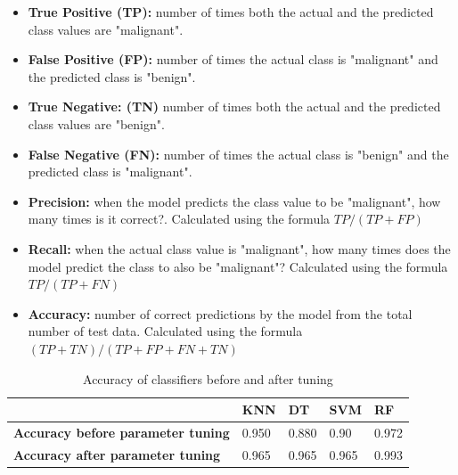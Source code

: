 \documentclass[journal]{IEEEtran}
\begin{document}
 \begin{itemize}
  \item \textbf{True Positive (TP):} number of times  both the actual and the predicted class values are "malignant".
  \item \textbf{False Positive (FP):} number of times the actual class is "malignant" and the predicted class is "benign".
  \item \textbf{True Negative: (TN)} number of times both the actual and the predicted class values are "benign".
  \item \textbf{False Negative (FN):} number of times the actual class is "benign" and the predicted class is "malignant".
  \item \textbf{Precision:} when the model predicts the class value to be "malignant", how many times is it correct?. Calculated using the formula $TP/(TP + FP)$
  \item \textbf{Recall:} when the actual class value is "malignant", how many times does the model predict the class to also be "malignant"? Calculated using the formula $TP/(TP + FN)$
  \item \textbf{Accuracy:} number of correct predictions by the model from the total number of test data. Calculated using the formula $(TP + TN) /(TP + FP + FN + TN)$\\
\end{itemize}

\begin{table}[htbp]
\centering
\setlength{\tabcolsep}{6pt}
\renewcommand{\arraystretch}{2}
\begin{tabular}{|l|l|l|l|l|}
\hline
                                          & \textbf{KNN} & \textbf{DT} & \textbf{SVM} & \textbf{RF} \\ \hline
\textbf{Accuracy before parameter tuning} & 0.950        & 0.880       & 0.90         & 0.972       \\ \hline
\textbf{Accuracy after parameter tuning}  & 0.965        & 0.965       & 0.965        & 0.993       \\ \hline
\end{tabular}
\caption{Accuracy of classifiers before and after tuning}
\label{table:1}
\end{table}
\end{document}
